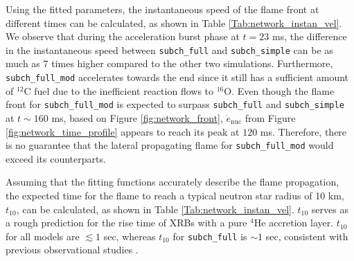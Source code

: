 \documentclass[preprint,times,tighten,linenumbers]{aastex631}
\begin{document}
Using the fitted parameters, the instantaneous speed of the flame front at different times can be calculated, as shown in Table \ref{Tab:network_instan_vel}. We observe that during the acceleration burst phase at $t = 23$ ms, the difference in the instantaneous speed between {\tt subch\_full} and {\tt subch\_simple} can be as much as 7 times higher compared to the other two simulations. Furthermore, {\tt subch\_full\_mod} accelerates towards the end since it still has a sufficient amount of ${}^{12}$C fuel due to the inefficient reaction flows to ${}^{16}$O. Even though the flame front for {\tt subch\_full\_mod} is expected to surpass {\tt subch\_full} and {\tt subch\_simple} at $t \sim 160$ ms, based on Figure \ref{fig:network_front}, $\dot{e}_{\textrm{nuc}}$ from Figure \ref{fig:network_time_profile} appears to reach its peak at $120$ ms. Therefore, there is no guarantee that the lateral propagating flame for {\tt subch\_full\_mod} would exceed its counterparts. 

Assuming that the fitting functions accurately describe the flame propagation, the expected time for the flame to reach a typical neutron star radius of 10 km, $t_{10}$, can be calculated, as shown in Table \ref{Tab:network_instan_vel}. $t_{10}$ serves as a rough prediction for the rise time of XRBs with a pure ${}^{4}$He accretion layer. $t_{10}$ for all models are $\lesssim 1$ sec, whereas $t_{10}$ for {\tt subch\_full} is $\sim 1$ sec, consistent with previous observational studies \citep{galloway:2008}.


\begin{comment}
\begin{figure*}
\centering
\plotone{integration_wallclock.pdf}
\caption{\label{fig:wallclock_time} Wallclock time used per simulation time as function of simulation time. Wallclock time analysis is only conducted for $t > 40$ ms as some simulation models used CPU while others used GPU for $t < 40$ ms.}
\end{figure*}

In order to give an overview of the computational expenses needed for each simulation models, Figure \ref{fig:wallclock_time} shows the wallclock time used per simulation time as a function of simulation time for all models. As some models utilized CPU while others used GPU for $t < 40$ ms, a wallclock time analysis fails to provide an accurate estimate of the computational expenses incurred by each model for during this time frame. Therefore, we have limited the presentation of our data to $t > 40$ ms. The results indicate that the four simulation models, which differ only in terms of their reaction networks, exhibit the expected trends. Specifically, the simulation model with the smallest network, {\tt aprox13}, that has the fewest isotopes and reaction rates requires the least amount of wallclock hours for $1$ ms of simulation time. Conversely, the largest network, {\tt subch\_full}, requires $\sim 3-4$ times the wallclock time needed by {\tt aprox13} to complete the same simulation. Notably, the computational cost for {\tt subch\_full\_mod} gradually increases over time, ultimately exceeding {\tt subch\_full}.

\end{comment}
\end{document}
